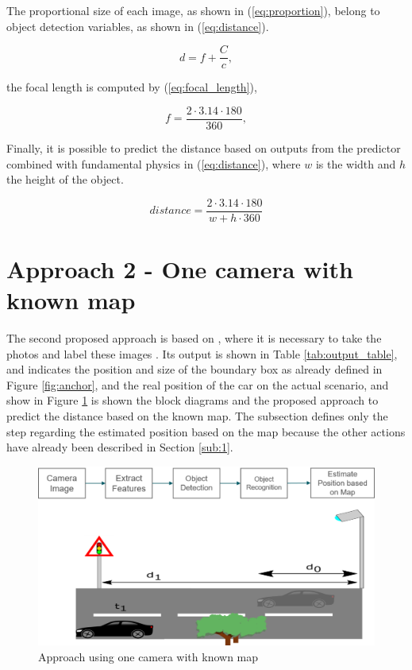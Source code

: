 The proportional size of each image, as shown in (\ref{eq:proportion}), belong to object detection variables, as shown in (\ref{eq:distance}).


\begin{equation}
    \label{eq:proportion}
    d = f + \frac{C}{c},
\end{equation}

the focal length is computed by (\ref{eq:focal_length}), 

\begin{equation}
    \label{eq:focal_length}
    f = \frac{2\cdot 3.14 \cdot 180}{360},
\end{equation}

Finally, it is possible to predict the distance based on outputs from the predictor combined with fundamental physics in (\ref{eq:distance}), where $w$ is the width and $h$ the height of the object.

\begin{equation}
    \label{eq:distance}
    distance = \frac{2 \cdot 3.14 \cdot  180}{w + h \cdot  360}
\end{equation}



 
\section{Approach 2 - One camera with known map}\label{sub:2}

The second proposed approach is based on  \cite{mayer2016large}, where it is necessary to take the photos and label these images \cite{tzutalin6labelimg}. Its output is shown in Table \ref{tab:output_table}, and indicates the position and size of the boundary box as already defined in Figure \ref{fig:anchor}, and the real position of the car on the actual scenario, and show in Figure \ref{fig:proposal2} is shown the block diagrams and the proposed approach to predict the distance based on the known map. The subsection defines only the step regarding the estimated position based on the map because the other actions have already been described in Section \ref{sub:1}. 


\begin{figure}[H]
\centering
\includegraphics[width=\textwidth]{imagens/proposal2.png}
\caption{Approach using one camera with known map}
\label{fig:proposal2}
\end{figure}



